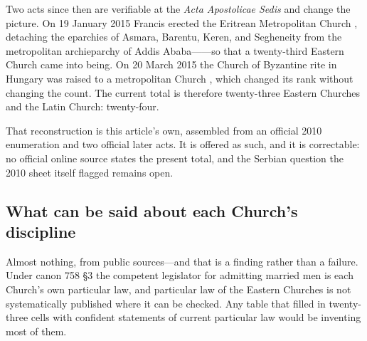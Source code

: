 Two acts since then are verifiable at the \emph{Acta Apostolicae Sedis} and change the picture. On 19 January 2015 Francis erected the Eritrean Metropolitan Church , detaching the eparchies of Asmara, Barentu, Keren, and Segheneity from the metropolitan archieparchy of Addis Ababa------so that a twenty-third Eastern Church came into being. On 20 March 2015 the Church of Byzantine rite in Hungary was raised to a metropolitan Church , which changed its rank without changing the count. The current total is therefore twenty-three Eastern Churches  and the Latin Church: twenty-four.

That reconstruction is this article's own, assembled from an official 2010 enumeration and two official later acts. It is offered as such, and it is correctable: no official online source states the present total, and the Serbian question the 2010 sheet itself flagged remains open.

\subsection{What can be said about each Church's discipline}

Almost nothing, from public sources---and that is a finding rather than a failure. Under canon 758 §3 the competent legislator for admitting married men is each Church's own particular law, and particular law of the Eastern Churches is not systematically published where it can be checked. Any table that filled in twenty-three cells with confident statements of current particular law would be inventing most of them.

